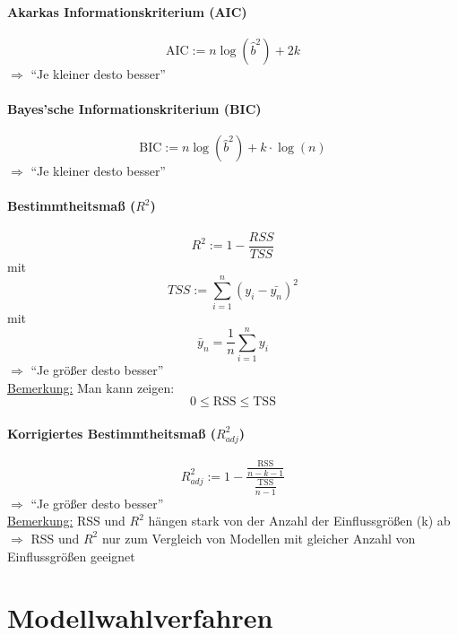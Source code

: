 \paragraph{Akarkas Informationskriterium (AIC) }
\[ \text{AIC} := n \log (\hat{b}^2) + 2k \]
$\Rightarrow$ ``Je kleiner desto besser''

\paragraph{Bayes'sche Informationskriterium (BIC)}
\[ \text{BIC} := n \log (\hat{b}^2) + k \cdot \log(n) \]
$\Rightarrow$ ``Je kleiner desto besser''

\paragraph{Bestimmtheitsmaß ($R^2$)}
\[ R^2 := 1 - \frac{RSS}{TSS} \]
mit 
\[ TSS := \sum\limits_{i=1}^n (y_i - \bar{y_n} )^2 \]
mit
\[ \bar{y}_n = \frac{1}{n} \sum\limits_{i=1}^{n}y_i \]
$\Rightarrow$ ``Je größer desto besser'' \\
\underline{Bemerkung:} Man kann zeigen:
\[ 0 \leq \text{RSS} \leq \text{TSS} \]

\paragraph{Korrigiertes Bestimmtheitsmaß ($R^{2}_{adj}$)}
\[ R_{adj}^{2} := 1 - \frac{\frac{\text{RSS}}{n-k-1}}{\frac{\text{TSS}}{n-1}} \]
$\Rightarrow$ ``Je größer desto besser'' \\
\underline{Bemerkung:} RSS und $R^{2}$ hängen stark von der Anzahl der Einflussgrößen (k) ab\\
$\Rightarrow$ RSS und $R^{2}$ nur zum Vergleich von Modellen mit gleicher Anzahl von Einflussgrößen geeignet

\section{Modellwahlverfahren}

